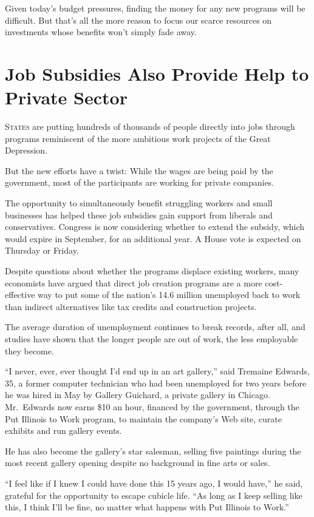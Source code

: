 ﻿\documentclass[12pt]{article}
\begin{document}
Given today's budget pressures, finding the money for any new programs will be difficult. But that's
all the more reason to focus our scarce resources on investments whose benefits won't simply fade
away.

\section{Job Subsidies Also Provide Help to Private Sector}

\lettrine{S}{tates} are putting hundreds of thousands of people directly
into jobs through programs reminiscent of the more ambitious work projects of the Great Depression.

But the new efforts have a twist: While the wages are being paid by the government, most of the
participants are working for private companies.

The opportunity to simultaneously benefit struggling workers and small businesses has helped these
job subsidies gain support from liberals and conservatives. Congress is now considering whether to
extend the subsidy, which would expire in September, for an additional year. A House vote is
expected on Thursday or Friday.

Despite questions about whether the programs displace existing workers, many economists have argued
that direct job creation programs are a more cost-effective way to put some of the nation's 14.6
million unemployed back to work than indirect alternatives like tax credits and construction
projects.

The average duration of unemployment continues to break records, after all, and studies have shown
that the longer people are out of work, the less employable they become.

``I never, ever, ever thought I'd end up in an art gallery,'' said Tremaine Edwards, 35, a former
computer technician who had been unemployed for two years before he was hired in May by Gallery
Guichard, a private gallery in Chicago. Mr.~Edwards now earns \$10 an hour, financed by the
government, through the Put Illinois to Work program, to maintain the company's Web site, curate
exhibits and run gallery events.

He has also become the gallery's star salesman, selling five paintings during the most recent
gallery opening despite no background in fine arts or sales.

``I feel like if I knew I could have done this 15 years ago, I would have,'' he said, grateful for
the opportunity to escape cubicle life. ``As long as I keep selling like this, I think I'll be fine,
no matter what happens with Put Illinois to Work.''
\end{document}
